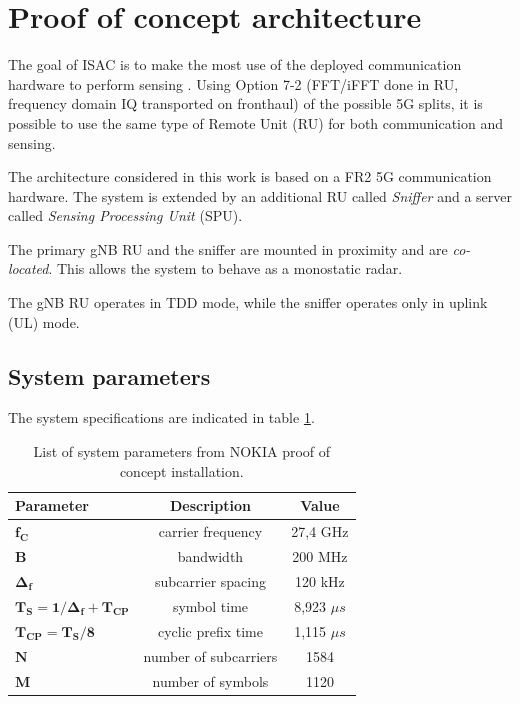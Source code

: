 \section{Proof of concept architecture}
	\label{sec:intro-PoCarchitecture}
	
	The goal of ISAC is to make the most use of the deployed communication hardware to perform sensing \cite{Wild_Grudnitsky_Mandelli_Henninger_Guan_Schaich_2023}. Using Option 7-2 (FFT/iFFT done in RU, frequency domain IQ transported on fronthaul) of the possible 5G splits, it is possible to use the same type of Remote Unit (RU) for both communication and sensing.
	
	The architecture considered in this work is based on a FR2 5G communication hardware. The system is extended by an additional RU called \textit{Sniffer} and a server called \textit{Sensing Processing Unit} (SPU).
	
	The primary gNB RU and the sniffer are mounted in proximity and are \textit{co-located}. This allows the system to behave as a monostatic radar.
	
	The gNB RU operates in TDD mode, while the sniffer operates only in uplink (UL) mode.
	
	\subsection{System parameters}
	
	The system specifications are indicated in table \ref{table:PoCparams}.
	
	\begin{table}[H]
		\centering 
		\begin{tabular}{|p{9em} c c |}
			\hline
			\rowcolor{bluepoli!40} %
			\textbf{Parameter} & \textbf{Description} & \textbf{Value}  \T\B \\
			\hline \hline
			$\bm{f_C}$ & carrier frequency & 27,4 GHz \T\B \\
			$\bm{B}$ & bandwidth & 200 MHz \T\B\\
			$\bm{\Delta_f}$ & subcarrier spacing & 120 kHz  \T\B\\
			$\bm{T_S = 1/\Delta_f + T_{CP}}$ & symbol time & 8,923 $\mu s$  \T\B\\
			$\bm{T_{CP} = T_S/8}$ & cyclic prefix time & 1,115 $\mu s$  \T\B\\
			$\bm{N}$ & number of subcarriers & 1584  \T\B\\
			$\bm{M}$ & number of symbols & 1120  \B\\
			
			\hline
		\end{tabular}
		\\[10pt]
		\caption{List of system parameters from NOKIA proof of concept installation.}
		\label{table:PoCparams}
	\end{table}
	
